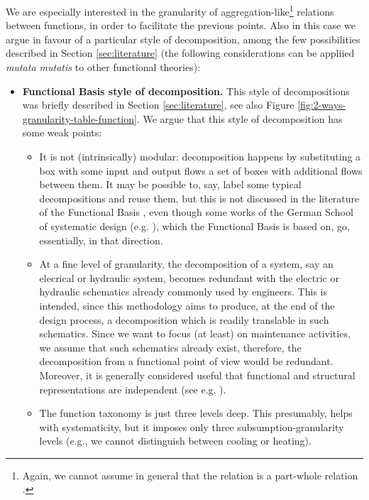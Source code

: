 \documentclass[
]{ceurart}
\begin{document}
We are especially interested in the granularity of aggregation-like\footnote{Again, we cannot assume in general that the relation is a part-whole relation \cite{vermaasFormalImpossibilityAnalysing2013}.} relations between functions, in order to facilitate the previous points. 
Also in this case we argue in favour of a particular style of decomposition, among the few possibilities described in Section \ref{sec:literature} (the following considerations can be appliied \textit{mutata mutatis} to other functional theories):

\begin{itemize}
  \item \textbf{Functional Basis style of decomposition.} This style of decompositions was briefly described in Section \ref{sec:literature}, see also Figure \ref{fig:2-ways-granularity-table-function}. We argue that this style of decomposition has some weak points:
  \begin{itemize}
    \item It is not (intrinsically) modular: decomposition happens by substituting a box with some input and output flows a set of boxes with additional flows between them. It may be possible to, say, label some typical decompositions and reuse them, but this is not discussed in the literature of the Functional Basis , even though some works of the German School of systematic design (e.g. \cite{rothKonstruierenMitKonstruktionskatalogen2000}), which the Functional Basis is based on, go, essentially, in that direction. 
    \item At a fine level of granularity, the decomposition of a system, say an elecrical or hydraulic system, becomes redundant with the electric or hydraulic schematics already commonly used by engineers. This is intended, since this methodology aims to produce, at the end of the design process, a decomposition which is readily translable in such schematics. Since we want to focus (at least) on maintenance activities, we assume that such schematics already exist, therefore, the decomposition from a functional point of view would be redundant. Moreover, it is generally considered useful that functional and structural representations are independent (see e.g. \cite{ISOIEC8134612009}).
    \item The function taxonomy is just three levels deep. This presumably, helps with systematicity, but it imposes only three subsumption-granularity levels (e.g., we cannot distinguish between cooling or heating).
  \end{itemize}

\end{itemize}
\end{document}
